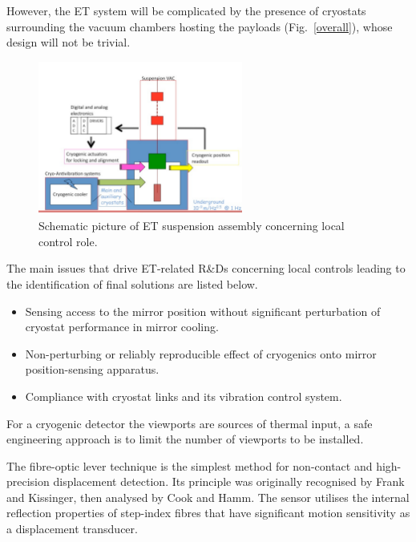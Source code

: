 However, the ET system will be complicated by the presence of cryostats surrounding the vacuum chambers hosting the payloads  (Fig.~\ref{overall}), whose design will  not be trivial.
 
\begin{figure}[htbp]
\begin{center}
\includegraphics[width=0.6\textwidth]{Sec_Suspensions/Figures/overall.pdf}
\caption{\label{overall}\sf Schematic picture of ET suspension assembly concerning local control role. }
\label{fig:overall}
\end{center}
\end{figure}

The main issues that drive ET-related  R\&Ds concerning local controls leading to the identification of final solutions are listed below. 
\begin{itemize}
\item Sensing access to the mirror position without significant perturbation of cryostat performance in mirror cooling. 
\item Non-perturbing or reliably reproducible effect of cryogenics onto mirror position-sensing apparatus.
\item Compliance with  cryostat links and its vibration control system. 
\end{itemize}

For a cryogenic detector the viewports are sources of thermal input, a safe engineering approach is to limit the number of viewports to be installed. 
 
\noindent
The fibre-optic lever technique is the simplest method for non-contact and high-precision displacement detection. Its principle was originally recognised by Frank and Kissinger, then analysed by Cook and Hamm. The sensor utilises the internal reflection properties of step-index fibres that have significant motion sensitivity as a displacement transducer.       

